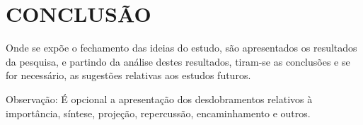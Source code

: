 
\chapter{CONCLUSÃO}

  Onde se expõe o fechamento das ideias do estudo, são apresentados os resultados da pesquisa, e partindo da análise destes resultados, tiram-se as conclusões e se for necessário, as sugestões relativas aos estudos futuros.

  Observação: É opcional a apresentação dos desdobramentos relativos à importância, síntese, projeção, repercussão, encaminhamento e outros.

